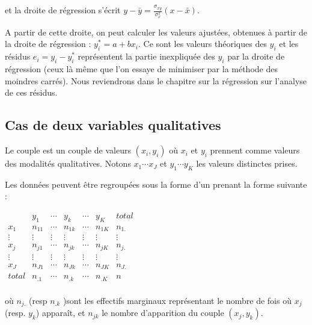 \documentclass[letterpaper,10pt,english]{jupyterBook}
\begin{document}
\sphinxAtStartPar
et la droite de régression s’écrit \(y-\bar{y}=\frac{\sigma_{xy}}{\sigma_x^2}\left ( x-\bar{x}\right )\).

\sphinxAtStartPar
A partir de cette droite, on peut calculer les valeurs ajustées, obtenues à partir de la droite de régression : \(y^*_i=a+bx_i\). Ce sont les valeurs théoriques des \(y_i\) et les résidus \(e_i=y_i-y_i^*\) représentent la partie inexpliquée des \(y_i\) par la droite de régression (ceux là même que l’on essaye de minimiser par la méthode des moindres carrés). Nous reviendrons dans le chapitre sur la régression sur l’analyse de ces résidus.


\subsection{Cas de deux variables qualitatives}
\label{\detokenize{statsdescriptives:cas-de-deux-variables-qualitatives}}
\sphinxAtStartPar
Le couple est un couple de valeurs \((x_i,y_i)\) où \(x_i\) et \(y_i\) prennent comme valeurs des modalités qualitatives. Notons \(x_1\cdots x_J\) et \(y_1\cdots y_K\) les valeurs distinctes prises.

\sphinxAtStartPar
Les données peuvent être regroupées sous la forme d’un  prenant la forme suivante :

\ignorespaces 
{}\ignorespaces 
\sphinxAtStartPar
\(\begin{array}{c|ccccc|c}
&y_1&\cdots&y_k&\cdots&y_K&total\\
\hline
x_1&n_{11}&\cdots&n_{1k}&\cdots&n_{1K}&n_{1.}\\
\vdots&\vdots&\vdots&\vdots&\vdots&\vdots&\vdots\\
x_j&n_{j1}&\cdots&n_{jk}&\cdots&n_{jK}&n_{j.}\\
\vdots&\vdots&\vdots&\vdots&\vdots&\vdots&\vdots\\
x_J&n_{J1}&\cdots&n_{Jk}&\cdots&n_{JK}&n_{J.}\\
\hline
total&n_{.1}&\cdots&n_{.k}&\cdots&n_{.K}&n\\
\end{array}
\)

\sphinxAtStartPar
où \(n_{j.}\) (resp \(n_{.k}\) )sont les effectifs marginaux représentant le nombre de fois où \(x_j\) (resp. \(y_k\)) apparaît, et \(n_{jk}\) le nombre d’apparition du couple \((x_j,y_k)\).
\end{document}
